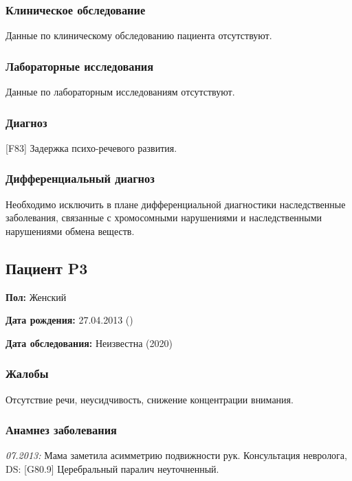 \documentclass[a4paper,14pt]{extarticle}
\newcommand{\pdate}[1]{\emph{#1:} }
\newcommand{\DS}[2]{[#2] #1}
\begin{document}
\subsubsection*{Клиническое обследование}

Данные по клиническому обследованию пациента отсутствуют.

\subsubsection*{Лабораторные исследования}

Данные по лабораторным исследованиям отсутствуют.

\subsubsection*{Диагноз}

\DS{Задержка психо-речевого развития}{F83}.

\subsubsection*{Дифференциальный диагноз}

Необходимо исключить в плане дифференциальной диагностики наследственные заболевания, связанные с хромосомными нарушениями и наследственными нарушениями обмена  веществ.

\newpage
\subsection*{Пациент P3}

\textbf{Пол:} Женский

\textbf{Дата рождения:} 27.04.2013 ()

\textbf{Дата обследования:} Неизвестна (2020)

\subsubsection*{Жалобы}

Отсутствие речи, неусидчивость, снижение концентрации внимания.

\subsubsection*{Анамнез заболевания}

\pdate{07.2013} Мама заметила асимметрию подвижности рук. Консультация невролога, DS: \DS{Церебральный паралич неуточненный}{G80.9}.
\end{document}
